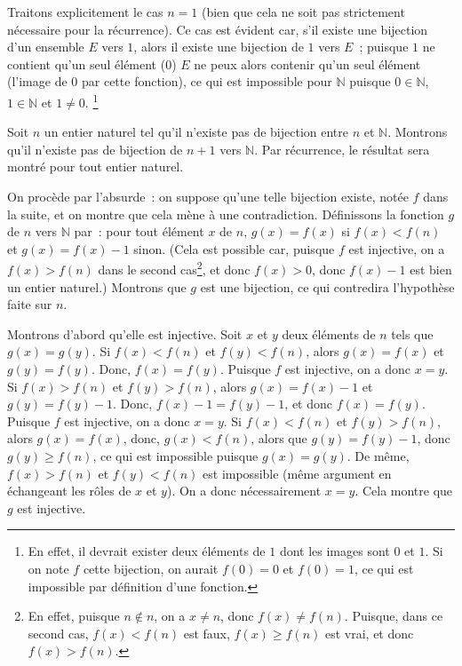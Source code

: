     Traitons explicitement le cas $n=1$ (bien que cela ne soit pas strictement nécessaire pour la récurrence). 
    Ce cas est évident car, s'il existe une bijection d'un ensemble $E$ vers $1$, alors il existe une bijection de $1$ vers $E$ ; puisque $1$ ne contient qu'un seul élément ($0$) $E$ ne peux alors contenir qu'un seul élément (l'image de $0$ par cette fonction), ce qui est impossible pour $\mathbb{N}$ puisque $0 \in \mathbb{N}$, $1 \in \mathbb{N}$ et $1 \neq 0$.%
    \footnote{
        En effet, il devrait exister deux éléments de $1$ dont les images sont $0$ et $1$. 
        Si on note $f$ cette bijection, on aurait $f(0) = 0$ et $f(0) = 1$, ce qui est impossible par définition d'une fonction.
    }

    Soit $n$ un entier naturel tel qu'il n'existe pas de bijection entre $n$ et $\mathbb{N}$. 
    Montrons qu'il n'existe pas de bijection de $n+1$ vers $\mathbb{N}$. 
    Par récurrence, le résultat sera montré pour tout entier naturel.

    On procède par l'absurde : on suppose qu'une telle bijection existe, notée $f$ dans la suite, et on montre que cela mène à une contradiction. 
    Définissons la fonction $g$ de $n$ vers $\mathbb{N}$ par : pour tout élément $x$ de $n$, $g(x) = f(x)$ si $f(x) < f(n)$ et $g(x) = f(x)-1$ sinon. 
    (Cela est possible car, puisque $f$ est injective, on a $f(x) > f(n)$ dans le second cas\footnote{En effet, puisque $n \notin n$, on a $x \neq n$, donc $f(x) \neq f(n)$. Puisque, dans ce second cas, $f(x) < f(n)$ est faux, $f(x) \geq f(n)$ est vrai, et donc $f(x) > f(n)$.}, et donc $f(x) > 0$, donc $f(x) - 1$ est bien un entier naturel.)
    Montrons que $g$ est une bijection, ce qui contredira l'hypothèse faite sur $n$. 

    Montrons d'abord qu'elle est injective. 
    Soit $x$ et $y$ deux éléments de $n$ tels que $g(x) = g(y)$. 
    Si $f(x) < f(n)$ et $f(y) < f(n)$, alors $g(x) = f(x)$ et $g(y) = f(y)$. 
    Donc, $f(x) = f(y)$.
    Puisque $f$ est injective, on a donc $x=y$. 
    Si $f(x) > f(n)$ et $f(y) > f(n)$, alors $g(x) = f(x)-1$ et $g(y) = f(y)-1$. 
    Donc, $f(x)-1 = f(y)-1$, et donc $f(x) = f(y)$.
    Puisque $f$ est injective, on a donc $x=y$. 
    Si $f(x) < f(n)$ et $f(y) > f(n)$, alors $g(x) = f(x)$, donc, $g(x) < f(n)$, alors que $g(y) = f(y)-1$, donc $g(y) \geq f(n)$, ce qui est impossible puisque $g(x) = g(y)$.
    De même, $f(x) > f(n)$ et $f(y) < f(n)$ est impossible (même argument en échangeant les rôles de $x$ et $y$). 
    On a donc nécessairement $x=y$. 
    Cela montre que $g$ est injective. 

